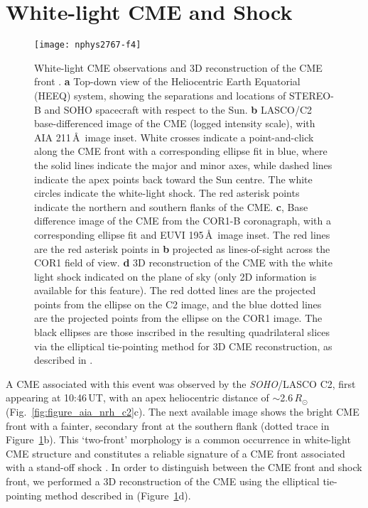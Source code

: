 \section{White-light CME and Shock}
\begin{figure}[ht!]
	\begin{center}
		\texttt{[image: nphys2767-f4]}
		\caption[3D reconstruction of CME and white-light shock]{White-light CME observations and 3D reconstruction of the CME front \citep{carley2013}. {\bf a} Top-down view of the Heliocentric Earth Equatorial (HEEQ) system, showing the separations and locations of STEREO-B and SOHO spacecraft with respect to the Sun. {\bf b} LASCO/C2 base-differenced image of the CME (logged intensity scale), with AIA 211\,\AA~image inset. White crosses indicate a point-and-click along the CME front with a corresponding ellipse fit in blue, where the solid lines indicate the major and minor axes, while dashed lines indicate the apex points back toward the Sun centre. The white circles indicate the white-light shock. The red asterisk points indicate the northern and southern flanks of the CME. {\bf c}, Base difference image of the CME from the COR1-B coronagraph, with a corresponding ellipse fit and EUVI 195\,\AA~image inset. The red lines are the red asterisk points in {\bf b} projected as lines-of-sight across the COR1 field of view. {\bf d} 3D reconstruction of the CME with the white light shock indicated on the plane of sky (only 2D information is available for this feature). The red dotted lines are the projected points from the ellipse on the C2 image, and the blue dotted lines are the projected points from the ellipse on the COR1 image. The black ellipses are those inscribed in the resulting quadrilateral slices via the elliptical tie-pointing method for 3D CME reconstruction, as described in \citep{byrne2010}.}
		\label{fig:3d_cme}
	\end{center}
\end{figure}
A CME associated with this event was observed by the \emph{SOHO}/LASCO C2, first appearing at 10:46\,UT, with an apex heliocentric distance of $\sim$2.6\,$R_{\odot}$ (Fig.~\ref{fig:figure_aia_nrh_c2}c). The next available image shows the bright CME front with a fainter, secondary front at the southern flank (dotted trace in Figure~\ref{fig:3d_cme}b). This `two-front' morphology is a common occurrence in white-light CME structure and constitutes a reliable signature of a CME front associated with a stand-off shock \citep{vourlidas2012}. In order to distinguish between the CME front and shock front, we performed a 3D reconstruction of the CME using the elliptical tie-pointing method described in \cite{byrne2010} (Figure~\ref{fig:3d_cme}d). 

